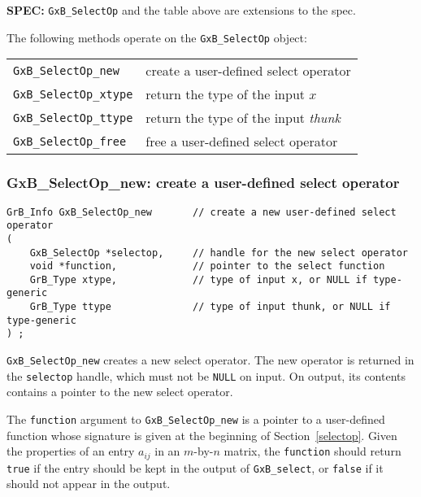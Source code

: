 \documentclass[12pt]{article}
\begin{document}
\begin{spec}
{\bf SPEC:} \verb'GxB_SelectOp' and the table above
are extensions to the spec.
\end{spec}

The following methods operate on the \verb'GxB_SelectOp' object:

\vspace{0.1in}
{\footnotesize
\begin{tabular}{ll}
\hline
\verb'GxB_SelectOp_new'   & create a user-defined select operator  \\
\verb'GxB_SelectOp_xtype' & return the type of the input $x$ \\
\verb'GxB_SelectOp_ttype' & return the type of the input {\em thunk} \\
\verb'GxB_SelectOp_free'  & free a user-defined select operator  \\
\hline
\end{tabular}
}
\vspace{0.1in}

\subsubsection{{\sf GxB\_SelectOp\_new:} create a user-defined select operator}
\label{selectop_new}

\begin{mdframed}[userdefinedwidth=6in]
{\footnotesize
\begin{verbatim}
GrB_Info GxB_SelectOp_new       // create a new user-defined select operator
(
    GxB_SelectOp *selectop,     // handle for the new select operator
    void *function,             // pointer to the select function
    GrB_Type xtype,             // type of input x, or NULL if type-generic
    GrB_Type ttype              // type of input thunk, or NULL if type-generic
) ;
\end{verbatim} }\end{mdframed}

\verb'GxB_SelectOp_new' creates a new select operator.  The new operator is
returned in the \verb'selectop' handle, which must not be \verb'NULL' on input.
On output, its contents contains a pointer to the new select operator.

The \verb'function' argument to \verb'GxB_SelectOp_new' is a pointer to a
user-defined function whose signature is given at the beginning of
Section~\ref{selectop}.  Given the properties of an entry $a_{ij}$ in an
$m$-by-$n$ matrix, the \verb'function' should return \verb'true' if the entry
should be kept in the output of \verb'GxB_select', or \verb'false' if it should
not appear in the output.
\end{document}
